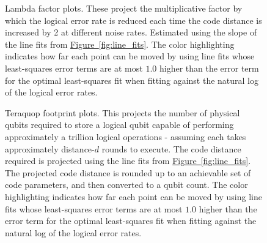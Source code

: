 \documentclass[onecolumn,unpublished,a4paper]{quantumarticle}
\theoremstyle{definition}
\theoremstyle{definition}
\theoremstyle{definition}
\newcommand{\fig}[1]{\hyperref[fig:#1]{Figure~\ref*{fig:#1}}}
\begin{document}
\begin{figure}[ht!]
    \centering
    \caption{
    Lambda factor plots.
    These project the multiplicative factor by which the logical error rate is reduced each time the code distance is increased by 2 at different noise rates.
    Estimated using the slope of the line fits from \fig{line_fits}.
    The color highlighting indicates how far each point can be moved by using line fits whose least-squares error terms are at most $1.0$ higher than the error term for the optimal least-squares fit when fitting against the natural log of the logical error rates.
    }
    \label{fig:lambdas}
\end{figure}

\begin{figure}[htb!]
    \centering
    \caption{
    Teraquop footprint plots.
    This projects the number of physical qubits required to store a logical qubit capable of performing approximately a trillion logical operations - assuming each takes approximately distance-$d$ rounds to execute.
    The code distance required is projected using the line fits from \fig{line_fits}.
    The projected code distance is rounded up to an achievable set of code parameters, and then converted to a qubit count.
    The color highlighting indicates how far each point can be moved by using line fits whose least-squares error terms are at most $1.0$ higher than the error term for the optimal least-squares fit when fitting against the natural log of the logical error rates.
    }
    \label{fig:teraquop_footprints}
\end{figure}
\end{document}
